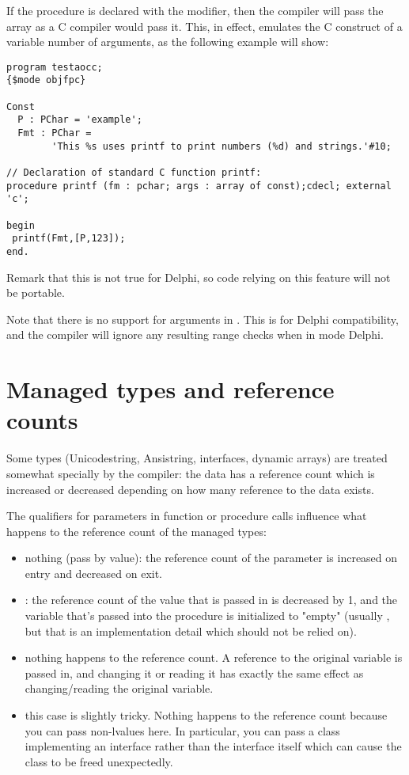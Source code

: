 If the procedure is declared with the  modifier, then the
compiler will pass the array as a C compiler would pass it. This, in effect,
emulates the C construct of a variable number of arguments, as the following
example will show:
\begin{verbatim}
program testaocc;
{$mode objfpc}

Const
  P : PChar = 'example';
  Fmt : PChar =
        'This %s uses printf to print numbers (%d) and strings.'#10;

// Declaration of standard C function printf:
procedure printf (fm : pchar; args : array of const);cdecl; external 'c';

begin
 printf(Fmt,[P,123]);
end.
\end{verbatim}
Remark that this is not true for Delphi, so code relying on this feature
will not be portable.

\begin{remark}
Note that there is no support for  arguments in . 
This is for Delphi compatibility, and the compiler will ignore any resulting range checks
when in mode Delphi.
\end{remark}

\section{Managed types and reference counts}
Some types (Unicodestring, Ansistring, interfaces, dynamic arrays) are
treated somewhat specially by the compiler: the data has a reference count
which is increased or decreased depending on how many reference to the data
exists.

The qualifiers for parameters in function or procedure calls influence
what happens to the reference count of the managed types:
\begin{itemize}
\item nothing (pass by value): the reference count of the parameter is increased 
on entry and decreased on exit.
\item {}: the reference count of the value that is passed in is decreased by 1,
 and the variable that's passed into the procedure is initialized to "empty"
(usually , but that is an implementation detail which should not
be relied on).
\item {} nothing happens to the reference count. A reference to the original
 variable is passed in, and changing it or reading it has exactly the same effect as changing/reading the original variable.
\item {} this case is slightly tricky. Nothing happens to the reference
count because you can pass non-lvalues here. 
In particular, you can pass a class implementing an interface rather than the interface itself
which can cause the class to be freed unexpectedly.
\end{itemize}

